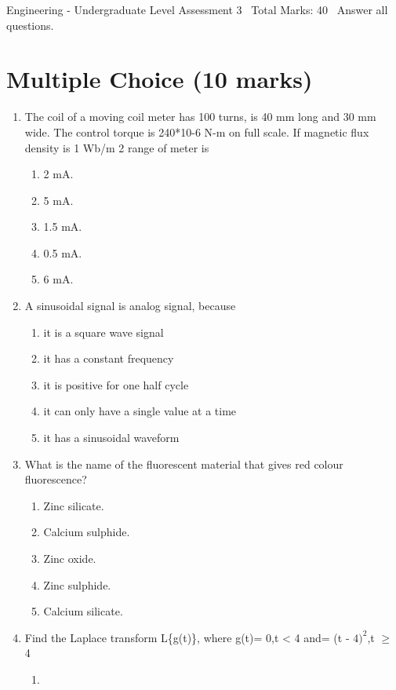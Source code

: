 \documentclass[12pt]{article}
\begin{document}
\begin{center}
Engineering - Undergraduate Level Assessment 3 \
Total Marks: 40 \
Answer all questions.
\end{center}

\section*{Multiple Choice (10 marks)}
\begin{enumerate}[label=\arabic*.]
\item The coil of a moving coil meter has 100 turns, is 40 mm long and 30 mm wide. The control torque is 240*10-6 N-m on full scale. If magnetic flux density is 1 Wb/m 2 range of meter is
\begin{enumerate}[label=(\alph*)]
    \item 2 mA.
    \item 5 mA.
    \item 1.5 mA.
    \item 0.5 mA.
    \item 6 mA.
\end{enumerate}
\item A sinusoidal signal is analog signal, because
\begin{enumerate}[label=(\alph*)]
    \item it is a square wave signal
    \item it has a constant frequency
    \item it is positive for one half cycle
    \item it can only have a single value at a time
    \item it has a sinusoidal waveform
\end{enumerate}
\item What is the name of the fluorescent material that gives red colour fluorescence?
\begin{enumerate}[label=(\alph*)]
    \item Zinc silicate.
    \item Calcium sulphide.
    \item Zinc oxide.
    \item Zinc sulphide.
    \item Calcium silicate.
\end{enumerate}
\item Find the Laplace transform L\{g(t)\}, where g(t)= 0,t \textless{} 4 and= (t - $4)^2$,t \ensuremath{\geq} 4
\begin{enumerate}[label=(\alph*)]
    \item [(2 e^-4 s) / $s^3$]

\end{enumerate}
\end{enumerate}
\end{document}
